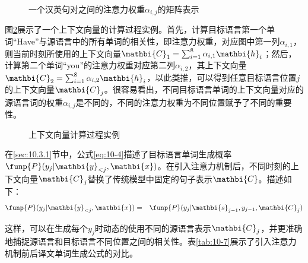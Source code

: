 \begin{itemize}
\begin{figure}[htp]
\centering

\caption{一个汉英句对之间的注意力权重{$\alpha_{i,j}$}的矩阵表示}
\label{fig:10-20}
\end{figure}

\vspace{0.5em}
\end{itemize}

\parinterval 图\ref{fig:10-21}展示了一个上下文向量的计算过程实例。首先，计算目标语言第一个单词“Have”与源语言中的所有单词的相关性，即注意力权重，对应图中第一列$\alpha_{i,1}$，则当前时刻所使用的上下文向量$\mathbi{C}_1 = \sum_{i=1}^8 \alpha_{i,1} \mathbi{h}_i$；然后，计算第二个单词“you”的注意力权重对应第二列$\alpha_{i,2}$，其上下文向量$\mathbi{C}_2 = \sum_{i=1}^8 \alpha_{i,2} \mathbi{h}_i$，以此类推，可以得到任意目标语言位置$j$的上下文向量$\mathbi{C}_j$。很容易看出，不同目标语言单词的上下文向量对应的源语言词的权重$\alpha_{i,j}$是不同的，不同的注意力权重为不同位置赋予了不同的重要性。

\begin{figure}[htp]
\centering

\caption{上下文向量计算过程实例}
\label{fig:10-21}
\end{figure}

\parinterval 在\ref{sec:10.3.1}节中，公式\eqref{eq:10-4}描述了目标语言单词生成概率$ \funp{P} (y_j | \mathbi{y}_{<j},\mathbi{x})$。在引入注意力机制后，不同时刻的上下文向量$\mathbi{C}_j$替换了传统模型中固定的句子表示$\mathbi{C}$。描述如下：
\begin{eqnarray}
\funp{P} (y_j | \mathbi{y}_{<j},\mathbi{x}) &=& \funp{P} (y_j | \mathbi{s}_{j-1},y_{j-1},\mathbi{C}_j )
\label{eq:10-20}
\end{eqnarray}

\parinterval 这样，可以在生成每个$y_j$时动态的使用不同的源语言表示$\mathbi{C}_j$，并更准确地捕捉源语言和目标语言不同位置之间的相关性。表\ref{tab:10-7}展示了引入注意力机制前后译文单词生成公式的对比。
\vspace{0.5em}

